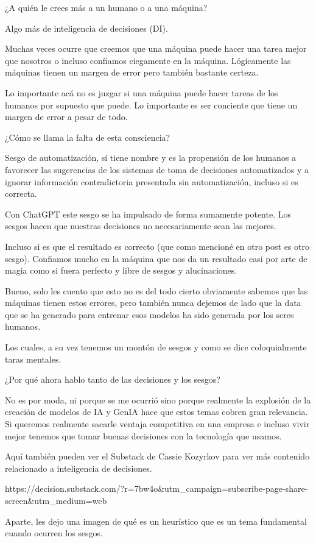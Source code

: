 ¿A quién le crees más a un humano o a una máquina?


Algo más de inteligencia de decisiones (DI).


Muchas veces ocurre que creemos que una máquina puede hacer una tarea mejor que nosotros o incluso confiamos ciegamente en la máquina. Lógicamente las máquinas tienen un margen de error pero también bastante certeza. 


Lo importante acá no es juzgar si una máquina puede hacer tareas de los humanos por supuesto que puede. Lo importante es ser conciente que tiene un margen de error a pesar de todo.


¿Cómo se llama la falta de esta consciencia? 


Sesgo de automatización, sí tiene nombre y es la propensión de los humanos a favorecer las sugerencias de los sistemas de toma de decisiones automatizados y a ignorar información contradictoria presentada sin automatización, incluso si es correcta.


Con ChatGPT este sesgo se ha impulsado de forma sumamente potente. Los sesgos hacen que nuestras decisiones no necesariamente sean las mejores. 


Incluso si es que el resultado es correcto (que como mencioné en otro post es otro sesgo). Confiamos mucho en la máquina que nos da un resultado casi por arte de magia como si fuera perfecto y libre de sesgos y alucinaciones. 


Bueno, solo les cuento que esto no es del todo cierto obviamente sabemos que las máquinas tienen estos errores, pero también nunca dejemos de lado que la data que se ha generado para entrenar esos modelos ha sido generada por los seres humanos. 


Los cuales, a su vez tenemos un montón de sesgos y como se dice coloquialmente taras mentales. 


¿Por qué ahora hablo tanto de las decisiones y los sesgos?


No es por moda, ni porque se me ocurrió sino porque realmente la explosión de la creación de modelos de IA y GenIA hace que estos temas cobren gran relevancia. Si queremos realmente sacarle ventaja competitiva en una empresa e incluso vivir mejor tenemos que tomar buenas decisiones con la tecnología que usamos. 


Aquí también pueden ver el Substack de Cassie Kozyrkov para ver más contenido relacionado a inteligencia de decisiones. 


https://decision.substack.com/?r=7bw4o&utm_campaign=subscribe-page-share-screen&utm_medium=web


Aparte, les dejo una imagen de qué es un heurístico que es un tema fundamental cuando ocurren los sesgos.






